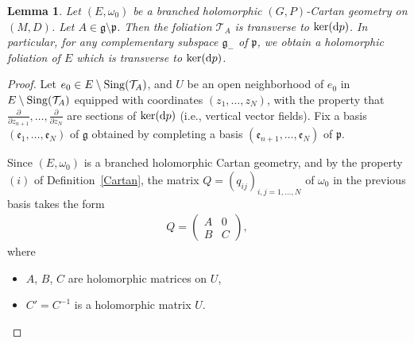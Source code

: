 \documentclass[pdftex]{sigma}
\newcommand{\der}[2]{\frac{\partial #1}{\partial#2}}
\numberwithin{equation}{section}
\newtheorem{Lemma}[Theorem]{Lemma}
\begin{document}
\begin{Lemma}\label{branchedfoliation} Let $(E,\omega_0)$ be a branched holomorphic $(G,P)$-Cartan geometry on $(M,D)$. Let $A\in \mathfrak{g}\setminus \mathfrak{p}$. Then the foliation $\mathcal{T}_A$ is transverse to $\ker({\rm d}p)$. In particular, for any complementary subspace $\mathfrak{g}_-$ of $\mathfrak{p}$, we obtain a holomorphic foliation of $E$ which is transverse to $\ker({\rm d}p)$. \end{Lemma}
\begin{proof}
Let $e_0\in E\setminus {\rm Sing}(\mathcal{T}_A)$, and $U$ be an open neighborhood of $e_0$ in $E\setminus {\rm Sing}(\mathcal{T}_A)$ equipped with coordinates $(z_1,\dots,z_N)$, with the property that $\der{}{z_{n+1}},\dots,\der{}{z_{N}}$ are sections of $\ker({\rm d}p)$ (i.e., vertical vector fields). Fix a basis $(\mathfrak{e}_1,\dots,\mathfrak{e}_N)$ of $\mathfrak{g}$ obtained by completing a basis $(\mathfrak{e}_{n+1},\dots,\mathfrak{e}_N)$ of $\mathfrak{p}$.


Since $(E,\omega_0)$ is a branched holomorphic Cartan geometry, and by the property $(i)$ of Definition~\ref{Cartan}, the matrix $Q=(q_{ij})_{i,j=1,\dots,N}$ of $\omega_0$ in the previous basis takes the form %
 \begin{align*} Q = \begin{pmatrix}
 A & 0 \\ B & C \end{pmatrix}, \end{align*}
 where
  \begin{itemize}\itemsep=0pt
\item $A$, $B$, $C$ are holomorphic matrices on $U$,
\item $C'=C^{-1}$ is a holomorphic matrix $U$.
\end{itemize}


\end{proof}
\end{document}
